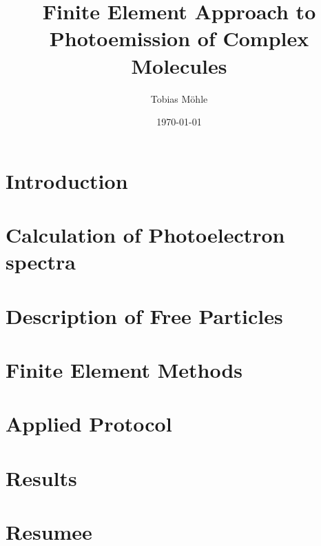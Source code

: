 \documentclass[12pt,a4paper,oneside]{book}
\author{Tobias M\"ohle}
\date{\today }
\title{Finite Element Approach to Photoemission of Complex Molecules}
\begin{document}
\indent
\pagestyle{plain}
\parindent6mm
\setlength{\parskip}{0mm}
\renewcommand{\vec}{\bm}
\newcommand{\mat}[1]{\mathbb{#1}}
\newcommand{\prog}[1]{\texttt{#1}}
\newcommand{\eq}[1]{eq. (\ref{#1})}
\newcommand{\eqs}[1]{eqs. (\ref{#1})}
\frontmatter
\maketitle
\tableofcontents
\newpage

\mainmatter
\chapter{Introduction} %


\chapter{Calculation of Photoelectron spectra}


\chapter{Description of Free Particles} 


\chapter{Finite Element Methods}


\chapter{Applied Protocol}


\chapter{Results}


\chapter{Resumee}


\small{
\printbibliography
}
\end{document}
